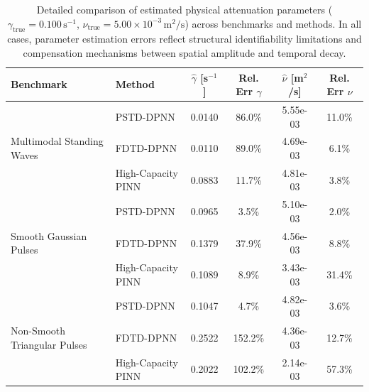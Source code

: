\begin{table}[H]
\centering
\small
\caption{Detailed comparison of estimated physical attenuation parameters ($\gamma_{\mathrm{true}} = 0.100\,\mathrm{s}^{-1}$, $\nu_{\mathrm{true}} = 5.00 \times 10^{-3}\,\mathrm{m}^2/\mathrm{s}$) across benchmarks and methods. In all cases, parameter estimation errors reflect structural identifiability limitations and compensation mechanisms between spatial amplitude and temporal decay.}
\label{tab:dpnn_param_estimation}
\begin{tabular}{llcccc}
\toprule
\textbf{Benchmark} & \textbf{Method} & $\hat{\gamma}$ [s$^{-1}$] & Rel. Err $\gamma$ & $\hat{\nu}$ [m$^2$/s] & Rel. Err $\nu$ \\
\midrule
\multirow{3}{*}{Multimodal Standing Waves} & PSTD-DPNN & 0.0140 & 86.0\% & 5.55e-03 & 11.0\% \\
 & FDTD-DPNN & 0.0110 & 89.0\% & 4.69e-03 & 6.1\% \\
 & High-Capacity PINN & 0.0883 & 11.7\% & 4.81e-03 & 3.8\% \\
\midrule
\multirow{3}{*}{Smooth Gaussian Pulses} & PSTD-DPNN & 0.0965 & 3.5\% & 5.10e-03 & 2.0\% \\
 & FDTD-DPNN & 0.1379 & 37.9\% & 4.56e-03 & 8.8\% \\
 & High-Capacity PINN & 0.1089 & 8.9\% & 3.43e-03 & 31.4\% \\
\midrule
\multirow{3}{*}{Non-Smooth Triangular Pulses} & PSTD-DPNN & 0.1047 & 4.7\% & 4.82e-03 & 3.6\% \\
 & FDTD-DPNN & 0.2522 & 152.2\% & 4.36e-03 & 12.7\% \\
 & High-Capacity PINN & 0.2022 & 102.2\% & 2.14e-03 & 57.3\% \\
\bottomrule
\end{tabular}
\end{table}
